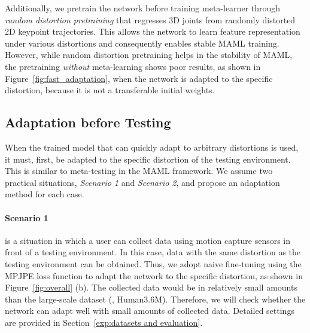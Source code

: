         Additionally, we pretrain the network before training meta-learner through \textit{random distortion pretraining} that regresses 3D joints from randomly distorted 2D keypoint trajectories. This allows the network to learn feature representation under various distortions and consequently enables stable MAML training. However, while random distortion pretraining helps in the stability of MAML, the pretraining \emph{without} meta-learning shows poor results, as shown in Figure~\ref{fig:fast_adaptation}, when the network is adapted to the specific distortion, because it is not a transferable initial weights.
    
    \subsection{Adaptation before Testing}
        When the trained model that can quickly adapt to arbitrary distortions is used, it must, first, be adapted to the specific distortion of the testing environment. This is similar to meta-testing in the MAML framework. We assume two practical situations, \textit{Scenario 1} and \textit{Scenario 2}, and propose an adaptation method for each case.
        \vspace{-4mm}
        
        \paragraph{Scenario 1} is a situation in which a user can collect data using motion capture sensors in front of a testing environment. In this case, data with the same distortion as the testing environment can be obtained. Thus, we adopt naive fine-tuning using the MPJPE loss function to adapt the network to the specific distortion, as shown in Figure~\ref{fig:overall} (b). The collected data would be in relatively small amounts than the large-scale dataset (\eg, Human3.6M). Therefore, we will check whether the network can adapt well with small amounts of collected data. Detailed settings are provided in Section~\ref{exp:datasets and evaluation}.
        \vspace{-4mm}
        
